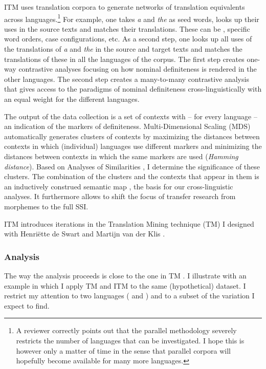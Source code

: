 \documentclass[output=paper,
modfonts
]{langscibook}
\begin{document}
ITM uses translation corpora to generate networks of translation equivalents across languages.\footnote{A reviewer correctly points out that the parallel methodology severely restricts the number of languages that can be investigated. I hope this is however only a matter of time in the sense that parallel corpora will hopefully become available for many more languages.} For example, one takes \textit{a} and \textit{the} as seed words, looks up their uses in the  source texts and matches their translations. These can be , specific word orders, case configurations, etc. As a second step, one looks up all uses of the translations of \textit{a} and \textit{the} in the source and target texts and matches the translations of these in all the languages of the corpus. The first step creates one-way contrastive analyses focusing on how  nominal definiteness is rendered in the other languages. The second step creates a many-to-many contrastive analysis that gives access to the paradigms of nominal definiteness cross-linguistically with an equal weight for the different languages.

The output of the data collection is a set of contexts with -- for every language -- an indication of the markers of definiteness. Multi-Dimensional Scaling (MDS) automatically generates clusters of contexts by maximizing the distances between contexts in which (individual) languages use different markers and minimizing the distances between contexts in which the same markers are used (\textit{Hamming distance}). Based on Analyses of Similarities \citep{Clarke1993,Oksanenetal2017}, I determine the significance of these clusters. The combination of the clusters and the contexts that appear in them is an inductively construed semantic map \citep{Haspelmath1997}, the basis for our cross-linguistic analyses. It furthermore allows to shift the focus of transfer research from morphemes to the full SSI.

ITM introduces iterations in the Translation Mining technique (TM) I designed with Henriëtte de Swart and Martijn van der Klis \citep{vanderKlisetal2017}.

\subsubsection{Analysis}\largerpage[-1]

The way the analysis proceeds is close to the one in TM \citep[e.g.][]{deSwart2017}. I illustrate with an example in which I apply TM and ITM to the same (hypothetical) dataset. I restrict my attention to two languages ( and ) and to a subset of the variation I expect to find.
\end{document}
